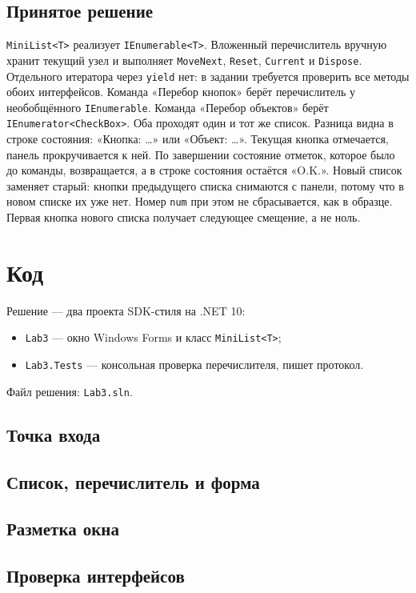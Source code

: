 \documentclass[a4paper,14pt]{extarticle}
\begin{document}
\subsection{Принятое решение}
\texttt{MiniList<T>} реализует \texttt{IEnumerable<T>}. Вложенный перечислитель вручную хранит текущий узел и выполняет \texttt{MoveNext}, \texttt{Reset}, \texttt{Current} и \texttt{Dispose}. Отдельного итератора через \texttt{yield} нет: в задании требуется проверить все методы обоих интерфейсов.
Команда «Перебор кнопок» берёт перечислитель у необобщённого \texttt{IEnumerable}. Команда «Перебор объектов» берёт \texttt{IEnumerator<CheckBox>}. Оба проходят один и тот же список. Разница видна в строке состояния: «Кнопка: \ldots» или «Объект: \ldots». Текущая кнопка отмечается, панель прокручивается к ней. По завершении состояние отметок, которое было до команды, возвращается, а в строке состояния остаётся «O.K.».
Новый список заменяет старый: кнопки предыдущего списка снимаются с панели, потому что в новом списке их уже нет. Номер \texttt{num} при этом не сбрасывается, как в образце. Первая кнопка нового списка получает следующее смещение, а не ноль.
\section{Код}
Решение — два проекта SDK-стиля на .NET 10:
\begin{itemize}
\item \texttt{Lab3} — окно Windows Forms и класс \texttt{MiniList<T>};
\item \texttt{Lab3.Tests} — консольная проверка перечислителя, пишет протокол.
\end{itemize}
Файл решения: \texttt{Lab3.sln}.
\subsection{Точка входа}

\subsection{Список, перечислитель и форма}

\subsection{Разметка окна}

\subsection{Проверка интерфейсов}

\end{document}
